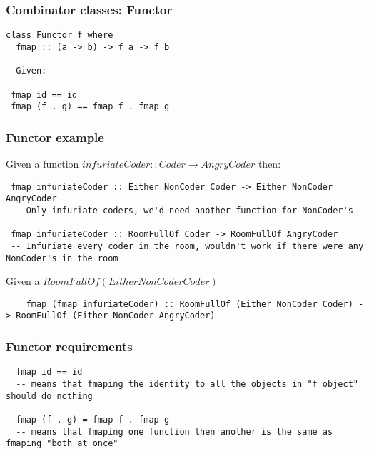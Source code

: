 \documentclass{beamer}
\begin{document}
\begin{frame}
\frametitle{Combinator classes: Functor}

\begin{lstlisting}
class Functor f where
  fmap :: (a -> b) -> f a -> f b

  Given:

 fmap id == id
 fmap (f . g) == fmap f . fmap g
\end{lstlisting}

\end{frame}


%
%


\begin{frame}
\frametitle{Functor example}

Given a function $infuriateCoder :: Coder \to AngryCoder$ then:
\begin{lstlisting}
 fmap infuriateCoder :: Either NonCoder Coder -> Either NonCoder AngryCoder
 -- Only infuriate coders, we'd need another function for NonCoder's

 fmap infuriateCoder :: RoomFullOf Coder -> RoomFullOf AngryCoder
 -- Infuriate every coder in the room, wouldn't work if there were any NonCoder's in the room
\end{lstlisting}


Given a $RoomFullOf (Either NonCoder Coder)$
  \begin{lstlisting}
    fmap (fmap infuriateCoder) :: RoomFullOf (Either NonCoder Coder) -> RoomFullOf (Either NonCoder AngryCoder)
  \end{lstlisting}

\end{frame}


\begin{frame}
\frametitle{Functor requirements}

\begin{lstlisting}
  fmap id == id
  -- means that fmaping the identity to all the objects in "f object" should do nothing

  fmap (f . g) = fmap f . fmap g
  -- means that fmaping one function then another is the same as fmaping "both at once"
\end{lstlisting}

%
%
\end{frame}
\end{document}
